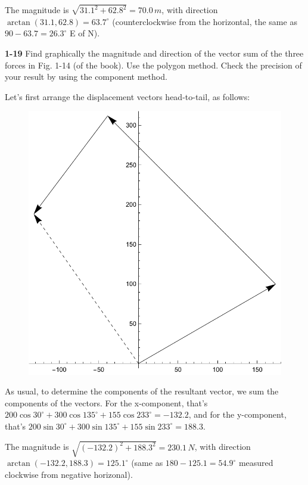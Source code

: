 \documentclass{amsart}
\begin{document}
The magnitude is $\sqrt{31.1^2+62.8^2} = 70.0\,m$, with direction $\arctan(31.1, 62.8) = 63.7^\circ$
(counterclockwise from the horizontal, the same as $90 - 63.7 = 26.3^\circ$ E of N).

\textbf{1-19} Find graphically the magnitude and direction of the vector sum of the three forces in Fig. 1-14 (of the book).
Use the polygon method.
Check the precision of your result by using the component method.

Let's first arrange the displacement vectors head-to-tail, as follows:

\begin{figure}[h]
\includegraphics[scale=0.32]{1-19}
\end{figure}

As usual, to determine the components of the resultant vector, we sum the components of the vectors.
For the x-component, that's $200 \cos 30^\circ + 300 \cos 135^\circ + 155 \cos 233^\circ = -132.2$,
and for the y-component, that's $200 \sin 30^\circ + 300 \sin 135^\circ + 155 \sin 233^\circ = 188.3$.

The magnitude is $\sqrt{(-132.2)^2 + 188.3^2} = 230.1\,N$, with direction $\arctan(-132.2, 188.3) = 125.1^\circ$
(same as $180 - 125.1 = 54.9^\circ$ measured clockwise from negative horizonal).
\end{document}

